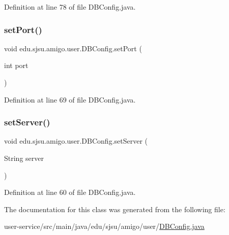Definition at line 78 of file D\+B\+Config.\+java.

\mbox{\label{classedu_1_1sjsu_1_1amigo_1_1user_1_1_d_b_config_abb3ef6c225e2bde1f020194091bf7704}} 
\subsubsection{\texorpdfstring{set\+Port()}{setPort()}}
{\footnotesize\ttfamily void edu.\+sjsu.\+amigo.\+user.\+D\+B\+Config.\+set\+Port (\begin{DoxyParamCaption}\item[{int}]{port }\end{DoxyParamCaption})}



Definition at line 69 of file D\+B\+Config.\+java.

\mbox{\label{classedu_1_1sjsu_1_1amigo_1_1user_1_1_d_b_config_ac7910a15504582593a1ad04b94f6bd03}} 
\subsubsection{\texorpdfstring{set\+Server()}{setServer()}}
{\footnotesize\ttfamily void edu.\+sjsu.\+amigo.\+user.\+D\+B\+Config.\+set\+Server (\begin{DoxyParamCaption}\item[{String}]{server }\end{DoxyParamCaption})}



Definition at line 60 of file D\+B\+Config.\+java.



The documentation for this class was generated from the following file\+:\begin{DoxyCompactItemize}
\item 
user-\/service/src/main/java/edu/sjsu/amigo/user/\hyperlink{_d_b_config_8java}{D\+B\+Config.\+java}\end{DoxyCompactItemize}
